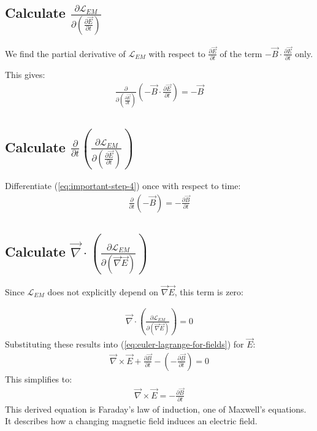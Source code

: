 \begin{enumerate}
\subsection*{Calculate $\displaystyle\frac{\partial \mathcal{L}_{EM}}{\displaystyle\partial \left(\frac{\partial \vec{E}}{\partial t}\right)}$}

We find the partial derivative of $\mathcal{L}_{EM}$ with respect to $\displaystyle\frac{\partial \vec{E}}{\partial t}$ of the term $\displaystyle-\vec{B} \cdot \frac{\partial \vec{E}}{\partial t}$ only.

This gives:
\begin{align}
    \frac{\partial}{\displaystyle\partial \left(\frac{\partial \vec{E}}{\partial t}\right)} \left( -\vec{B} \cdot \frac{\partial \vec{E}}{\partial t} \right) = -\vec{B}\label{eq:important-step-4}
\end{align}
\subsection*{Calculate $\displaystyle\frac{\partial}{\partial t} \left( \frac{\partial \mathcal{L}_{EM}}{\displaystyle\partial \left(\frac{\partial \vec{E}}{\partial t}\right)} \right)$}

Differentiate (\ref{eq:important-step-4}) once with respect to time:
\begin{align}
    \frac{\partial}{\partial t} \left( -\vec{B} \right) = -\frac{\partial \vec{B}}{\partial t}
\end{align}

\subsection*{Calculate $\displaystyle\vec{\nabla} \cdot \left( \frac{\partial \mathcal{L}_{EM}}{\partial (\vec{\nabla} \vec{E})} \right)$}

Since $\mathcal{L}_{EM}$ does not explicitly depend on $\vec{\nabla} \vec{E}$, this term is zero:

\begin{align}
    \vec{\nabla} \cdot \left( \frac{\partial \mathcal{L}_{EM}}{\partial (\vec{\nabla} \vec{E})} \right) = 0
\end{align}
Substituting these results into (\ref{eq:euler-lagrange-for-fields}) for $\vec{E}$:
\begin{align}
    \vec{\nabla} \times \vec{E} + \frac{\partial \vec{B}}{\partial t} - \left(-\frac{\partial \vec{B}}{\partial t}\right) = 0
\end{align}
This simplifies to:
\begin{align}
    \vec{\nabla} \times \vec{E} = -\frac{\partial \vec{B}}{\partial t}
\end{align}
This derived equation is Faraday's law of induction, one of Maxwell's equations. It describes how a changing magnetic field induces an electric field.


\end{enumerate}
